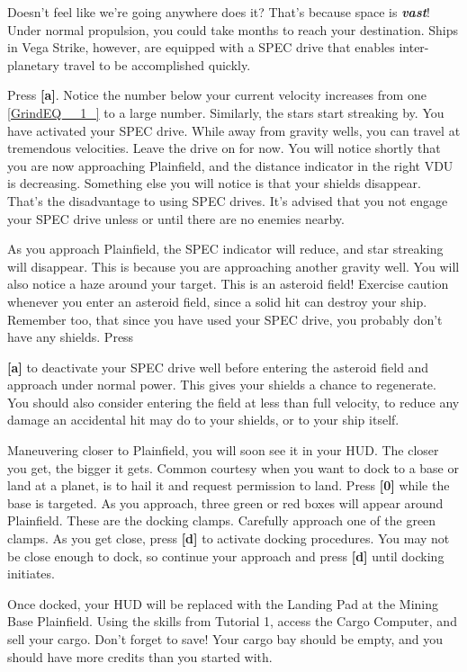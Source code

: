 \documentclass{article}
\begin{document}
Doesn't feel like we're going anywhere does it? That's because space is \textbf{\textit{vast}}! Under normal propulsion, you could take months to reach your destination. Ships in Vega Strike, however, are equipped with a SPEC drive that enables inter-planetary travel to be accomplished quickly. 

Press \textbf{[a]}. Notice the number below your current velocity increases from one \eqref{GrindEQ__1_} to a large number.  Similarly, the stars start streaking by. You have activated your SPEC drive. While away from gravity wells, you can travel at tremendous velocities. Leave the drive on for now. You will notice shortly that you are now approaching Plainfield, and the distance indicator in the right VDU is decreasing. Something else you will notice is that your shields disappear. That's the disadvantage to using SPEC drives. It's advised that you not engage your SPEC drive unless or until there are no enemies nearby. 

As you approach Plainfield, the SPEC indicator will reduce, and star streaking will disappear. This is because you are approaching another gravity well. You will also notice a haze around your target. This is an asteroid field! Exercise caution whenever you enter an asteroid field, since a solid hit can destroy your ship. Remember too, that since you have used your SPEC drive, you probably don't have any shields. Press 

\textbf{[a] }to deactivate your SPEC drive well before entering the asteroid field and approach under normal power. This gives your shields a chance to regenerate. You should also consider entering the field at less than full velocity, to reduce any damage an accidental hit may do to your shields, or to your ship itself. 

Maneuvering closer to Plainfield, you will soon see it in your HUD. The closer you get, the bigger it gets.  Common courtesy when you want to dock to a base or land at a planet, is to hail it and request permission to land. Press \textbf{[0] }while the base is targeted. As you approach, three green or red boxes will appear around Plainfield. These are the docking clamps. Carefully approach one of the green clamps. As you get close, press \textbf{[d] }to activate docking procedures. You may not be close enough to dock, so continue your approach and press \textbf{[d]} until docking initiates. 

Once docked, your HUD will be replaced with the Landing Pad at the Mining Base Plainfield. Using the skills from Tutorial 1, access the Cargo Computer, and sell your cargo. Don't forget to save! Your cargo bay should be empty, and you should have more credits than you started with. 
\end{document}
